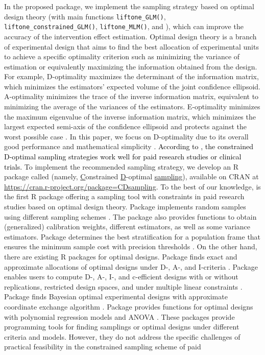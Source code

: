 In the proposed  package, we implement the sampling strategy based on optimal design theory (with main functions \texttt{liftone\_GLM()}, \texttt{liftone\_constrained\_GLM()}, \texttt{liftone\_MLM()},  and \texttt{}), which can improve the accuracy of the intervention effect estimation. Optimal design theory is a branch of experimental design that aims to find the best allocation of experimental units to achieve a specific optimality criterion such as minimizing the variance of estimation or equivalently maximizing the information obtained from the design. For example, D-optimality maximizes the determinant of the information matrix, which minimizes the estimators' expected volume of the joint confidence ellipsoid. A-optimality minimizes the trace of the inverse information matrix, equivalent to minimizing the average of the variances of the estimators. E-optimality minimizes the maximum eigenvalue of the inverse information matrix, which minimizes the largest expected semi-axis of the confidence ellipsoid and protects against the worst possible case \citep{fedorov1972,atkinson2007,yangmin2012,fedorov2014}. In this paper, we focus on D-optimality due to its overall good performance and mathematical simplicity \citep{atkinson1999,atkinson2007}. \textcolor{black}{According to \cite{huang2023constrained}, the constrained D-optimal sampling strategies work well for paid research studies or clinical trials.} To implement the recommended sampling strategy, we develop an R package called  (namely, \underline{C}onstrained \underline{D}-optimal \underline{sampling}), available on CRAN at \url{https://cran.r-project.org/package=CDsampling}. To the best of our knowledge,  is the first R package offering a sampling tool with constraints in paid research studies based on optimal design theory. Package  implements random samples using different sampling schemes \citep{tille2016package}. The package also provides functions to obtain (generalized) calibration weights, different estimators, as well as some variance estimators. Package  determines the best stratification for a population frame that ensures the minimum sample cost with precision thresholds \citep{barcaroli2014samplingstrata}. On the other hand, there are existing R packages for optimal designs. Package  finds exact and approximate allocations of optimal designs under D-, A-, and I-criteria \citep{wheeler2019package}.  Package  enables users to compute D-, A-, I-, and c-efficient designs with or without replications, restricted design spaces, and under multiple linear constraints \citep{harman2016package}. Package  finds Bayesian optimal experimental designs with approximate coordinate exchange algorithm \citep{overstall2017acebayes,overstall2018package}. Package  provides functions for optimal designs with polynomial regression models and ANOVA \citep{gromping2011optimal}. These packages provide programming tools for finding samplings or optimal designs under different criteria and models. However, they do not address the specific challenges of practical feasibility in the constrained sampling scheme of paid 